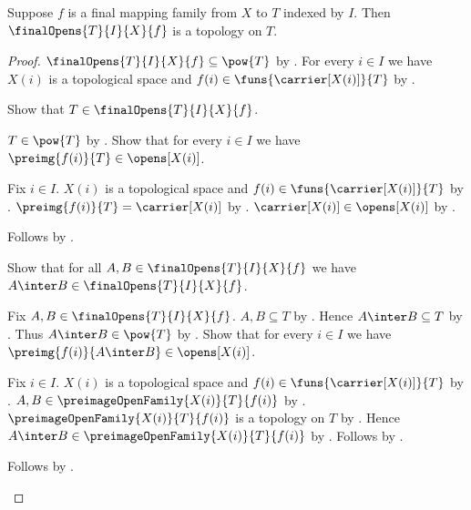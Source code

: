 \begin{theorem}\label{final_opens_is_topology}
    Suppose $f$ is a final mapping family from $X$ to $T$ indexed by $I$.
    Then $\finalOpens{T}{I}{X}{f}$ is a topology on $T$.
\end{theorem}
\begin{proof}
    $\finalOpens{T}{I}{X}{f}\subseteq\pow{T}$ by
        .
    For every $i\in I$ we have $X(i)$ is a topological space and
        $f(i)\in\funs{\carrier[X(i)]}{T}$ by
        .

    Show that $T\in\finalOpens{T}{I}{X}{f}$.
    \begin{subproof}
        $T\in\pow{T}$ by .
        Show that for every $i\in I$ we have
            $\preimg{f(i)}{T}\in\opens[X(i)]$.
        \begin{subproof}
            Fix $i\in I$.
            $X(i)$ is a topological space and
                $f(i)\in\funs{\carrier[X(i)]}{T}$ by
                .
            $\preimg{f(i)}{T}=\carrier[X(i)]$ by
                .
            $\carrier[X(i)]\in\opens[X(i)]$ by .
        \end{subproof}
        Follows by .
    \end{subproof}

    Show that for all $A,B\in\finalOpens{T}{I}{X}{f}$ we have
        $A\inter B\in\finalOpens{T}{I}{X}{f}$.
    \begin{subproof}
        Fix $A,B\in\finalOpens{T}{I}{X}{f}$.
        $A,B\subseteq T$ by .
        Hence $A\inter B\subseteq T$ by .
        Thus $A\inter B\in\pow{T}$ by .
        Show that for every $i\in I$ we have
            $\preimg{f(i)}{A\inter B}\in\opens[X(i)]$.
        \begin{subproof}
            Fix $i\in I$.
            $X(i)$ is a topological space and
                $f(i)\in\funs{\carrier[X(i)]}{T}$ by
                .
            $A,B\in\preimageOpenFamily{X(i)}{T}{f(i)}$ by
                .
            $\preimageOpenFamily{X(i)}{T}{f(i)}$ is a topology on $T$ by
                .
            Hence $A\inter B\in\preimageOpenFamily{X(i)}{T}{f(i)}$ by
                .
            Follows by .
        \end{subproof}
        Follows by .
    \end{subproof}


\end{proof}
